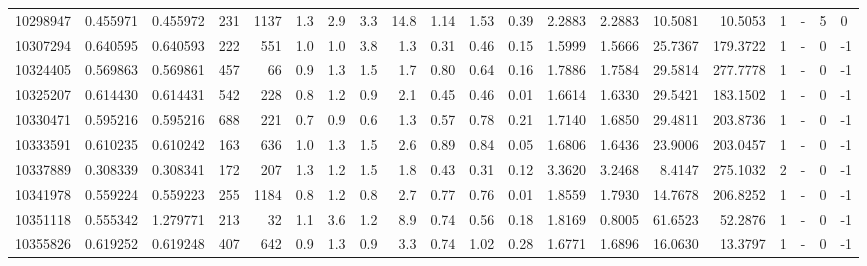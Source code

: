 \begin{tabular}{rrrrrrrrrrrrrrrrrlrl}
  10298947 & 0.455971 &   0.455972 &  231 & 1137 &      1.3 &      2.9 &     3.3 &     14.8 &       1.14 &        1.53 &        0.39 &  2.2883 &  2.2883 &   10.5081 &   10.5053 &       1 &             - &        5 &         0 \\
  10307294 & 0.640595 &   0.640593 &  222 &  551 &      1.0 &      1.0 &     3.8 &      1.3 &       0.31 &        0.46 &        0.15 &  1.5999 &  1.5666 &   25.7367 &  179.3722 &       1 &             - &        0 &        -1 \\
  10324405 & 0.569863 &   0.569861 &  457 &   66 &      0.9 &      1.3 &     1.5 &      1.7 &       0.80 &        0.64 &        0.16 &  1.7886 &  1.7584 &   29.5814 &  277.7778 &       1 &             - &        0 &        -1 \\
  10325207 & 0.614430 &   0.614431 &  542 &  228 &      0.8 &      1.2 &     0.9 &      2.1 &       0.45 &        0.46 &        0.01 &  1.6614 &  1.6330 &   29.5421 &  183.1502 &       1 &             - &        0 &        -1 \\
  10330471 & 0.595216 &   0.595216 &  688 &  221 &      0.7 &      0.9 &     0.6 &      1.3 &       0.57 &        0.78 &        0.21 &  1.7140 &  1.6850 &   29.4811 &  203.8736 &       1 &             - &        0 &        -1 \\
  10333591 & 0.610235 &   0.610242 &  163 &  636 &      1.0 &      1.3 &     1.5 &      2.6 &       0.89 &        0.84 &        0.05 &  1.6806 &  1.6436 &   23.9006 &  203.0457 &       1 &             - &        0 &        -1 \\
  10337889 & 0.308339 &   0.308341 &  172 &  207 &      1.3 &      1.2 &     1.5 &      1.8 &       0.43 &        0.31 &        0.12 &  3.3620 &  3.2468 &    8.4147 &  275.1032 &       2 &             - &        0 &        -1 \\
  10341978 & 0.559224 &   0.559223 &  255 & 1184 &      0.8 &      1.2 &     0.8 &      2.7 &       0.77 &        0.76 &        0.01 &  1.8559 &  1.7930 &   14.7678 &  206.8252 &       1 &             - &        0 &        -1 \\
  10351118 & 0.555342 &   1.279771 &  213 &   32 &      1.1 &      3.6 &     1.2 &      8.9 &       0.74 &        0.56 &        0.18 &  1.8169 &  0.8005 &   61.6523 &   52.2876 &       1 &             - &        0 &        -1 \\
  10355826 & 0.619252 &   0.619248 &  407 &  642 &      0.9 &      1.3 &     0.9 &      3.3 &       0.74 &        1.02 &        0.28 &  1.6771 &  1.6896 &   16.0630 &   13.3797 &       1 &             - &        0 &        -1 \\

\end{tabular}
